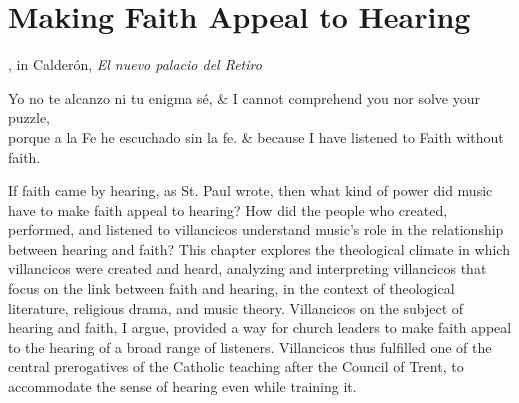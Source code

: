 
% 
% 
% 


\chapter{Making Faith Appeal to Hearing}
\label{ch:faith-hearing}

\begin{epigraph}{, in Calderón, 
    \emph{El nuevo palacio del Retiro}%
    \Autocite[l. 1327]{Calderon:Retiro}} %
    \begin{quotepoem}
        Yo no te alcanzo ni tu enigma sé, 
        & I cannot comprehend you nor solve your puzzle, \\

        porque a la Fe he escuchado sin la fe. 
        & because I have listened to Faith without faith.
    \end{quotepoem}
\end{epigraph}

If faith came by hearing, as St. Paul wrote, then what kind of power did music
have to make faith appeal to hearing? 
How did the people who created, performed, and listened to villancicos
understand music's role in the relationship between hearing and faith?
This chapter explores the theological climate in which villancicos were created
and heard, analyzing and interpreting villancicos that focus on the link between
faith and hearing, in the context of theological literature, religious drama,
and music theory.
Villancicos on the subject of hearing and faith, I argue, provided a way for
church leaders to make faith appeal to the hearing of a broad range of
listeners.  
Villancicos thus fulfilled one of the central prerogatives of the Catholic
teaching after the Council of Trent, to accommodate the sense of
hearing even while training it.

